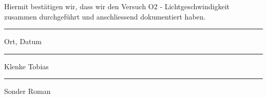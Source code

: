 Hiermit bestätigen wir, dass wir den Versuch O2 - Lichtgeschwindigkeit zusammen durchgeführt und anschliessend dokumentiert haben.\\[10mm]
\parbox{4cm}{\hrule
\strut \footnotesize Ort, Datum} 
\hfill\parbox{4cm}{\hrule
\strut \footnotesize Klenke Tobias}
\hfill\parbox{4cm}{\hrule
\strut \footnotesize Sonder Roman}